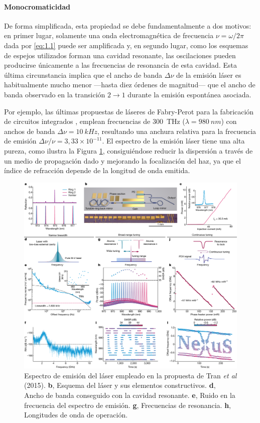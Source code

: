 \paragraph{Monocromaticidad}\label{par:1.1.2.1}
De forma simplificada, esta propiedad se debe fundamentalmente a dos motivos: en primer lugar, solamente una onda electromagnética de frecuencia $\nu=\omega/2 \pi$ dada por \eqref{eq:1.1} puede ser amplificada y, en segundo lugar, como los esquemas de espejos utilizados forman una cavidad resonante, las oscilaciones pueden producirse únicamente a las frecuencias de resonancia de esta cavidad. Esta última circunstancia implica que el ancho de banda $\Delta\nu$ de la emisión láser es habitualmente mucho menor ---hasta diez órdenes de magnitud--- que el ancho de banda observado en la transición $2\rightarrow 1$ durante la emisión espontánea asociada.

Por ejemplo, las últimas propuestas de láseres de Fabry-Perot para la fabricación de circuitos integrados \autocite{Tran2022}, emplean frecuencias de \qty{300}{THz} ($\lambda = \qty{980}{nm}$) con anchos de banda $\Delta\nu = \qty{10}{kHz}$, resultando una anchura relativa para la frecuencia de emisión $\Delta\nu/\nu = 3,33\times 10^{-11}$. El espectro de la emisión láser tiene una alta pureza, como ilustra la Figura \ref{fig:ch1_amplif}, consiguiéndose reducir la dispersión a través de un medio de propagación dado y mejorando la focalización del haz, ya que el índice de refracción depende de la longitud de onda emitida.

\begin{figure}[htpb]
  \centering
  \includegraphics[width=\textwidth]{Figuras/ch1_amplif.png}
  \caption{Espectro de emisión del láser empleado en la propuesta de Tran \emph{et al} (2015)\autocite{Tran2022}. \textbf{b}, Esquema del láser y sus elementos constructivos. \textbf{d}, Ancho de banda conseguido con la cavidad resonante. \textbf{e}, Ruido en la frecuencia del espectro de emisión. \textbf{g}, Frecuencias de resonancia. \textbf{h}, Longitudes de onda de operación.}
  \label{fig:ch1_amplif}
\end{figure}


